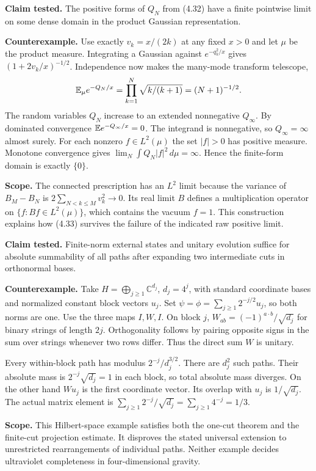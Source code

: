 \newpage
{}
\textbf{Claim tested.} The positive forms of $Q_N$ from (4.32) have a finite pointwise limit on some dense domain in the product Gaussian representation.

\textbf{Counterexample.} Use exactly $v_k=x/(2k)$ at any fixed $x>0$ and let $\mu$ be the product measure. Integrating a Gaussian against $e^{-q_k^2/x}$ gives $(1+2v_k/x)^{-1/2}$. Independence now makes the many-mode transform telescope,
\[
 \mathbb E_\mu e^{-Q_N/x}=\prod_{k=1}^N \sqrt{k/(k+1)}=(N+1)^{-1/2}.
\]
The random variables $Q_N$ increase to an extended nonnegative $Q_\infty$. By dominated convergence $\mathbb E e^{-Q_\infty/x}=0$. The integrand is nonnegative, so $Q_\infty=\infty$ almost surely. For each nonzero $f\in L^2(\mu)$ the set $|f|>0$ has positive measure. Monotone convergence gives $\lim_N\int Q_N|f|^2\,d\mu=\infty$. Hence the finite-form domain is exactly $\{0\}$.

\textbf{Scope.} The connected prescription has an $L^2$ limit because the variance of $B_M-B_N$ is $2\sum_{N<k\le M}v_k^2\to0$. Its real limit $B$ defines a multiplication operator on $\{f:Bf\in L^2(\mu)\}$, which contains the vacuum $f=1$. This construction explains how (4.33) survives the failure of the indicated raw positive limit.

\textbf{Claim tested.} Finite-norm external states and unitary evolution suffice for absolute summability of all paths after expanding two intermediate cuts in orthonormal bases.

\textbf{Counterexample.} Take $H=\bigoplus_{j\ge1}\mathbb C^{d_j}$, $d_j=4^j$, with standard coordinate bases and normalized constant block vectors $u_j$. Set $\psi=\phi=\sum_{j\ge1}2^{-j/2}u_j$, so both norms are one. Use the three maps $I,W,I$. On block $j$, $W_{ab}=(-1)^{a\cdot b}/\sqrt{d_j}$ for binary strings of length $2j$. Orthogonality follows by pairing opposite signs in the sum over strings whenever two rows differ. Thus the direct sum $W$ is unitary.

Every within-block path has modulus $2^{-j}/d_j^{3/2}$. There are $d_j^2$ such paths. Their absolute mass is $2^{-j}\sqrt{d_j}=1$ in each block, so total absolute mass diverges. On the other hand $Wu_j$ is the first coordinate vector. Its overlap with $u_j$ is $1/\sqrt{d_j}$. The actual matrix element is $\sum_{j\ge1}2^{-j}/\sqrt{d_j}=\sum_{j\ge1}4^{-j}=1/3$.

\textbf{Scope.} This Hilbert-space example satisfies both the one-cut theorem and the finite-cut projection estimate. It disproves the stated universal extension to unrestricted rearrangements of individual paths. Neither example decides ultraviolet completeness in four-dimensional gravity.

